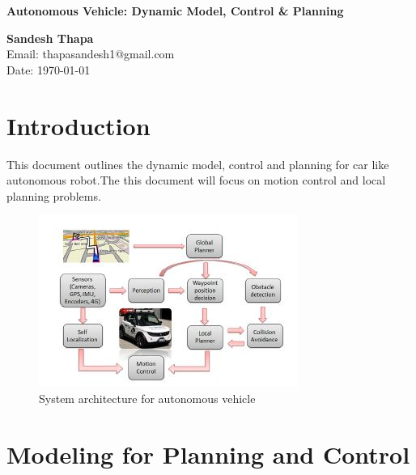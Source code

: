 \documentclass[11]{article}
\begin{document}
\begin{titlepage}
			 \begin{center}
				\vspace*{1cm}
				
				\Huge
				\textbf{Autonomous Vehicle: Dynamic Model, Control \& Planning}
				
				\vspace{1.0cm}
				
				\vspace{7.0cm}
				
				
				\textbf{Sandesh Thapa} \\
				Email: thapasandesh1@gmail.com \\
			   Date: {\today}
				
				\vfill
				
			
				
				
			
				
				
			\end{center}
\end{titlepage}


\pagestyle{fancy}
\fancyhf{}
\section{Introduction}
This document outlines the dynamic model, control and planning for car like autonomous robot.The this document will focus on motion control and local planning problems. 

\begin{figure}[!ht]
	\centering
		\includegraphics[scale=1.0]{Figure_block_dig}
		\caption{System architecture for autonomous vehicle}
		\label{fig:SysArch}
\end{figure}

\newpage
\section{Modeling for Planning and Control}
\end{document}
